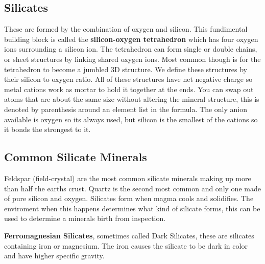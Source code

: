 \documentclass{article}
\begin{document}
\subsection{Silicates} %
\label{sub:silicates}
These are formed by the combination of oxygen and silicon. This fundimental building block is called the \textbf{silicon-oxygen tetrahedron} which has four oxygen ions surrounding a silicon ion. The tetrahedron can  form single or double chains, or sheet structures by linking shared oxygen ions. Most common though is for the tetrahedron to become a jumbled 3D structure. We define these structures by their silicon to oxygen ratio. All of these structures have net negative charge so metal cations work as mortar to hold it together at the ends. You can swap out atoms that are about the same size without altering the mineral structure, this is denoted by parenthesis around an element list in the formula. The only anion available is oxygen so its always used, but silicon is the smallest of the cations so it bonds the strongest to it.

\subsection{Common Silicate Minerals} %
\label{sub:common_silicate_minerals}
Feldspar (field-crystal) are the most common silicate minerals making up more than half the earths crust. Quartz is the second most common and only one made of pure silicon and oxygen. Silicates form when magma cools and solidifies. The enviroment when this happens determines what kind of silicate forms, this can be used to determine a minerals birth from inspection.

\textbf{Ferromagnesian Silicates}, sometimes called Dark Silicates, these are silicates containing iron or magnesium. The iron causes the silicate to be dark in color and have higher specific gravity.
\end{document}
